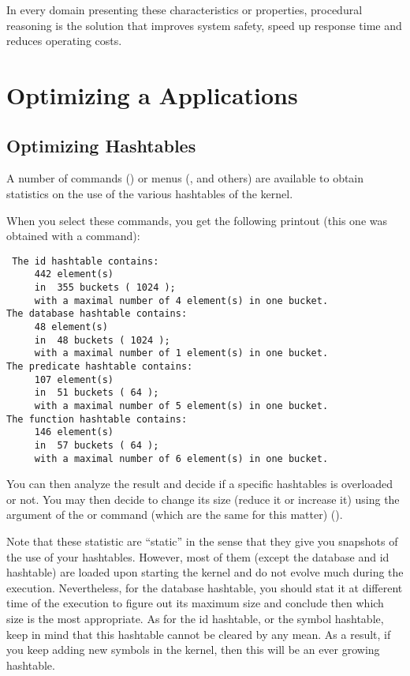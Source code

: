 In every domain presenting these characteristics or properties,
procedural reasoning is the solution that improves system safety, speed
up response time and reduces operating costs.


\chapter{Optimizing a \COPRS{} Applications}



\section{Optimizing Hashtables}

A number of commands () or menus
(, and others) are available to obtain statistics on
the use of the various hashtables of the kernel.

When you select these commands, you get the following printout (this one
was obtained with a  command):

\begin{verbatim}
 The id hashtable contains:
     442 element(s)
     in  355 buckets ( 1024 );
     with a maximal number of 4 element(s) in one bucket.
The database hashtable contains:
     48 element(s)
     in  48 buckets ( 1024 );
     with a maximal number of 1 element(s) in one bucket.
The predicate hashtable contains:
     107 element(s)
     in  51 buckets ( 64 );
     with a maximal number of 5 element(s) in one bucket.
The function hashtable contains:
     146 element(s)
     in  57 buckets ( 64 );
     with a maximal number of 6 element(s) in one bucket.
\end{verbatim}

You can then analyze the result and decide if a specific hashtables is
overloaded or not. You may then decide to change its size (reduce it or
increase it) using the argument of the  or  command
(which are the same for this matter) ().

Note that these statistic are ``static'' in the sense that they give you
snapshots of the use of your hashtables. However, most of them (except the
database and id hashtable) are loaded upon starting the kernel and do not
evolve much during the execution. Nevertheless, for the database hashtable, you
should stat it at different time of the execution to figure out its maximum
size and conclude then which size is the most appropriate. As for the id
hashtable, or the symbol hashtable, keep in mind that this hashtable cannot be
cleared by any mean. As a result, if you keep adding new symbols in the kernel,
then this will be an ever growing hashtable.

